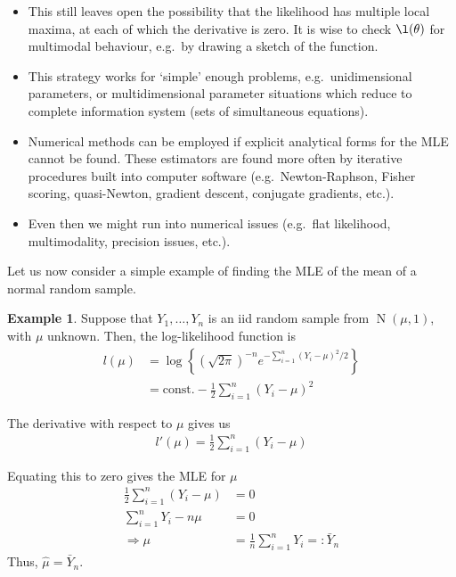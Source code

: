 \documentclass[
]{book}
\DeclareMathOperator{\N}{N}
\newcommand{\const}{\text{const.}}
\theoremstyle{definition}
\theoremstyle{definition}
\newtheorem{example}{Example}[chapter]
\theoremstyle{definition}
\theoremstyle{definition}
\theoremstyle{remark}
\begin{document}
\begin{itemize}
\item
  This still leaves open the possibility that the likelihood has multiple local maxima, at each of which the derivative is zero. It is wise to check \(\l(\theta)\) for multimodal behaviour, e.g.~by drawing a sketch of the function.
\item
  This strategy works for `simple' enough problems, e.g.~unidimensional parameters, or multidimensional parameter situations which reduce to complete information system (sets of simultaneous equations).
\item
  Numerical methods can be employed if explicit analytical forms for the MLE cannot be found. These estimators are found more often by iterative procedures built into computer software (e.g.~Newton-Raphson, Fisher scoring, quasi-Newton, gradient descent, conjugate gradients, etc.).
\item
  Even then we might run into numerical issues (e.g.~flat likelihood, multimodality, precision issues, etc.).
\end{itemize}

Let us now consider a simple example of finding the MLE of the mean of a normal random sample.

\begin{example}
Suppose that \(Y_1,\dots,Y_n\) is an iid random sample from
\(\N(\mu,1)\), with \(\mu\) unknown. Then,
the log-likelihood function is \[\begin{aligned}
     l(\mu)
     &= \log \left\{(\sqrt{2\pi})^{-n} e^{-\sum_{i=1}^n (Y_i-\mu)^2/2} \right\} \\
     &= \const 
     -\frac{1}{2}\sum_{i=1}^n  (Y_i-\mu)^2
     \end{aligned}\]

The derivative with respect to \(\mu\) gives us
\[\begin{aligned}
       l'(\mu) = \frac{1}{2}\sum_{i=1}^n  (Y_i-\mu)
     \end{aligned}\]

Equating this to zero gives the MLE for \(\mu\) \[\begin{aligned}
       \frac{1}{2}\sum_{i=1}^n  (Y_i-\mu) &= 0 \\
       \sum_{i=1}^n Y_i - n\mu  &= 0 \\
       \Rightarrow \mu &= \frac{1}{n}\sum_{i=1}^n Y_i =: \bar Y_n
     \end{aligned}\] Thus, \(\hat\mu=\bar Y_n\).
\end{example}
\end{document}
